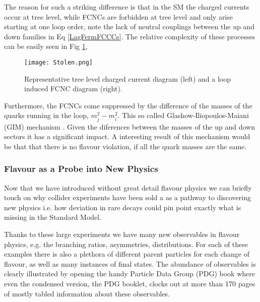 The reason for such a striking difference is that in the SM the charged currents occur at tree level, while FCNCs are forbidden at tree level and only arise starting at one loop order, note the lack of neutral couplings between the up and down families in Eq \ref{LagFermFCCCs}. The relative complexity of these processes can be easily seen in Fig \ref{fig:Flavour_D_1},
%
\begin{figure}[H]
	\centering
	\texttt{[image: Stolen.png]}
	\caption{Representative tree level charged current diagram (left) and a loop induced FCNC diagram (right).}
	\label{fig:Flavour_D_1}
\end{figure}
%
%
Furthermore, the FCNCs come suppressed by the difference of the masses of the quarks running in the loop, $m^2_j-m^2_i$. This so called Glashow-Iliopoulos-Maiani (GIM) mechanism \cite{glashow1970weak}. Given the diferences between the masses of the up and down sectors it has a significant impact. 
%
A interesting result of this mechanism would be that that there is no flavour violation, if all the quark masses are the same.

\subsubsection{Flavour as a Probe into New Physics}

Now that we have introduced without great detail flavour physics we can briefly touch on why collider experiments have been sold a as a pathway to discovering new physics i.e. how deviation in rare decays could pin point exactly what is missing in the Standard Model. 

Thanks to these large experiments we have many new observables in flavour physics, e.g. the branching ratios, asymmetries, distributions. For each of these examples there is also a plethora of different parent particles for each change of flavour, as well as many instances of final states. 
%
The abundance of observables is clearly illustrated by opening the handy Particle Data Group (PDG) book \cite{Tanabashi2018} where even the condensed version, the PDG booklet, clocks out at more than 170 pages of mostly tabled information about these observables.



